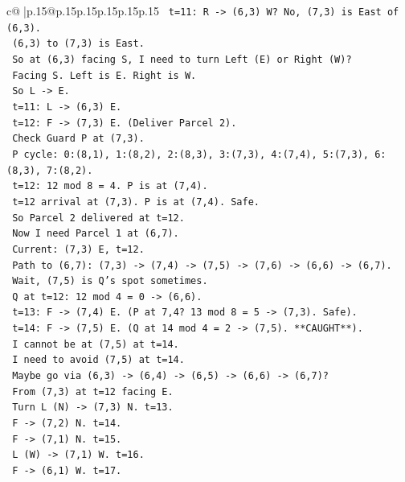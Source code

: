 \documentclass{article}
\begin{document}
{\begin{supertabular}{c@{$\;$}|p{.15\linewidth}@{}p{.15\linewidth}p{.15\linewidth}p{.15\linewidth}p{.15\linewidth}p{.15\linewidth}}
{{{\texttt{     t=11: R {-}> (6,3) W? No, (7,3) is East of (6,3).} \\
\texttt{     (6,3) to (7,3) is East.} \\
\texttt{     So at (6,3) facing S, I need to turn Left (E) or Right (W)?} \\
\texttt{     Facing S. Left is E. Right is W.} \\
\texttt{     So L {-}> E.} \\
\texttt{     t=11: L {-}> (6,3) E.} \\
\texttt{     t=12: F {-}> (7,3) E. (Deliver Parcel 2).} \\
\texttt{     Check Guard P at (7,3).} \\
\texttt{     P cycle: 0:(8,1), 1:(8,2), 2:(8,3), 3:(7,3), 4:(7,4), 5:(7,3), 6:(8,3), 7:(8,2).} \\
\texttt{     t=12: 12 mod 8 = 4. P is at (7,4).} \\
\texttt{     t=12 arrival at (7,3). P is at (7,4). Safe.} \\
\texttt{     So Parcel 2 delivered at t=12.} \\
\texttt{     Now I need Parcel 1 at (6,7).} \\
\texttt{     Current: (7,3) E, t=12.} \\
\texttt{     Path to (6,7): (7,3) {-}> (7,4) {-}> (7,5) {-}> (7,6) {-}> (6,6) {-}> (6,7).} \\
\texttt{     Wait, (7,5) is Q's spot sometimes.} \\
\texttt{     Q at t=12: 12 mod 4 = 0 {-}> (6,6).} \\
\texttt{     t=13: F {-}> (7,4) E. (P at 7,4? 13 mod 8 = 5 {-}> (7,3). Safe).} \\
\texttt{     t=14: F {-}> (7,5) E. (Q at 14 mod 4 = 2 {-}> (7,5). **CAUGHT**).} \\
\texttt{     I cannot be at (7,5) at t=14.} \\
\texttt{     I need to avoid (7,5) at t=14.} \\
\texttt{     Maybe go via (6,3) {-}> (6,4) {-}> (6,5) {-}> (6,6) {-}> (6,7)?} \\
\texttt{     From (7,3) at t=12 facing E.} \\
\texttt{     Turn L (N) {-}> (7,3) N. t=13.} \\
\texttt{     F {-}> (7,2) N. t=14.} \\
\texttt{     F {-}> (7,1) N. t=15.} \\
\texttt{     L (W) {-}> (7,1) W. t=16.} \\
\texttt{     F {-}> (6,1) W. t=17.} \\
}}}
\end{supertabular}}
\end{document}
